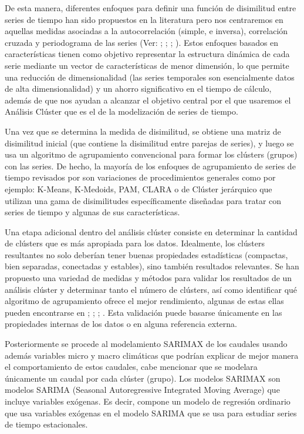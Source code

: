 \documentclass[10pt,a4paper]{article}
\begin{document}
De esta manera, diferentes enfoques para definir una función de disimilitud entre series de tiempo han sido propuestos en la literatura pero nos centraremos en aquellas medidas asociadas a la autocorrelación (simple, e inversa), correlación cruzada y periodograma de las series (Ver: \cite{struzik1999haar};  \cite{galeano2000multivariate}; \cite{caiado2006periodogram}; \cite{chouakria2007adaptive}). Estos enfoques basados en características tienen como objetivo representar la estructura dinámica de cada serie mediante un vector de características de menor dimensión, lo que permite una reducción de dimensionalidad (las series temporales son esencialmente datos de alta dimensionalidad) y un ahorro significativo en el tiempo de cálculo, además de que nos ayudan a alcanzar el objetivo central por el que usaremos el Análisis Clúster que es el de la modelización de series de tiempo.

Una vez que se determina la medida de disimilitud, se obtiene una matriz de disimilitud inicial (que contiene la disimilitud entre parejas de series), y luego se usa un algoritmo de agrupamiento convencional para formar los clústers (grupos) con las series. De hecho, la mayoría de los enfoques de agrupamiento de series de tiempo revisados por \cite{liao2005clustering} son variaciones de procedimientos generales como por ejemplo: K-Means, K-Medoids, PAM, CLARA \cite{kaufman1986clustering} o de Clúster jerárquico que utilizan una gama de disimilitudes específicamente diseñadas para tratar con series de tiempo y algunas de sus características. 

Una etapa adicional dentro del análisis clúster consiste en determinar la cantidad de clústers que es más apropiada para los datos. Idealmente, los clústers resultantes no solo deberían tener buenas propiedades estadísticas (compactas, bien separadas, conectadas y estables), sino también resultados relevantes. Se han propuesto una variedad de medidas y métodos para validar los resultados de un análisis clúster y determinar tanto el número de clústers, así como identificar qué algoritmo de agrupamiento ofrece el mejor rendimiento, algunas de estas ellas pueden encontrarse en \cite{fraley1998many}; \cite{duda2001pattern} ; \cite{salvador2004determining} ; \cite{kerr2001bootstrapping}. Esta validación puede basarse únicamente en las propiedades internas de los datos o en alguna referencia externa.

Posteriormente se procede al modelamiento SARIMAX de los caudales usando además variables micro y macro climáticas que podrían explicar de mejor manera el comportamiento de estos caudales, cabe mencionar que se modelara únicamente un caudal por cada clúster (grupo).
Los modelos SARIMAX son modelos SARIMA (Seasonal Autoregressive Integrated Moving Average) que incluye variables exógenas. Es decir, compone un modelo de regresión ordinario que usa variables exógenas en el modelo SARIMA que se usa para estudiar series de tiempo estacionales.
\end{document}
